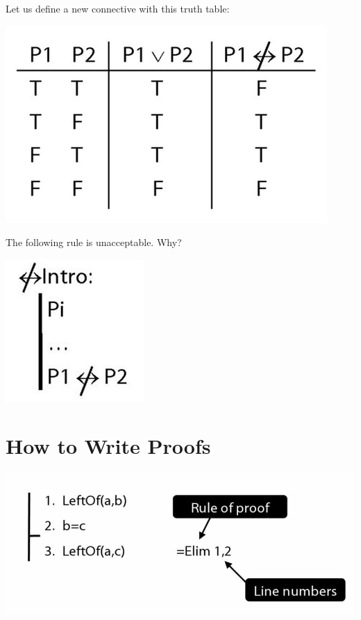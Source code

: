\documentclass[12pt]{extarticle}
\begin{document}
\begin{multicols*}{3}
\begin{minipage}{\columnwidth}
Let us define a new connective with this truth table:
 
\begin{center}
\includegraphics[scale=0.3]{img/tt_not_equivalent.png}
\end{center}
\end{minipage}
 
\begin{minipage}{\columnwidth}
 
The following rule is unacceptable. Why?
 
\begin{center}
\includegraphics[scale=0.3]{img/rule_not_equivalent_intro_wrong.png}
\end{center}
\end{minipage}
 
 
 
\section{How to Write Proofs}
 
\begin{center}
\includegraphics[scale=0.3]{img/how_to_write_proofs.png}
\end{center}
 

\end{multicols*}
\end{document}

